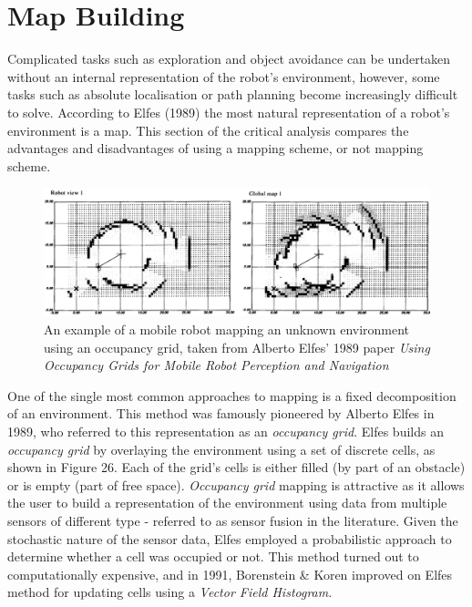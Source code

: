 \documentclass[a4paper]{article}
\begin{document}
\section{Map Building}
Complicated tasks such as exploration and object avoidance can be undertaken without an internal representation of the robot's environment, however, some tasks such as absolute localisation or path planning become increasingly difficult to solve. According to Elfes (1989) the most natural representation of a robot's environment is a map. This section of the critical analysis compares the advantages and disadvantages of using a mapping scheme, or not mapping scheme.
\begin{figure}[h]
\centering
\includegraphics[scale=0.3]{occupancy_grid}
\caption{An example of a mobile robot mapping an unknown environment using an occupancy grid, taken from Alberto Elfes' 1989 paper \textit{Using Occupancy Grids for Mobile Robot Perception and Navigation}}
\end{figure}

One of the single most common approaches to mapping is a fixed decomposition of an environment. This method was famously pioneered by Alberto Elfes in 1989, who referred to this representation as an \textit{occupancy grid}. Elfes builds an \textit{occupancy grid} by overlaying the environment using a set of discrete cells, as shown in Figure 26. Each of the grid's cells is either filled (by part of an obstacle) or is empty (part of free space). \textit{Occupancy grid} mapping is attractive as it allows the user to build a representation of the environment using data from multiple sensors of different type - referred to as sensor fusion in the literature. Given the stochastic nature of the sensor data, Elfes employed a probabilistic approach to determine whether a cell was occupied or not. This method turned out to computationally expensive, and in 1991, Borenstein \& Koren improved on Elfes method for updating cells using a \textit{Vector Field Histogram}.
\end{document}
